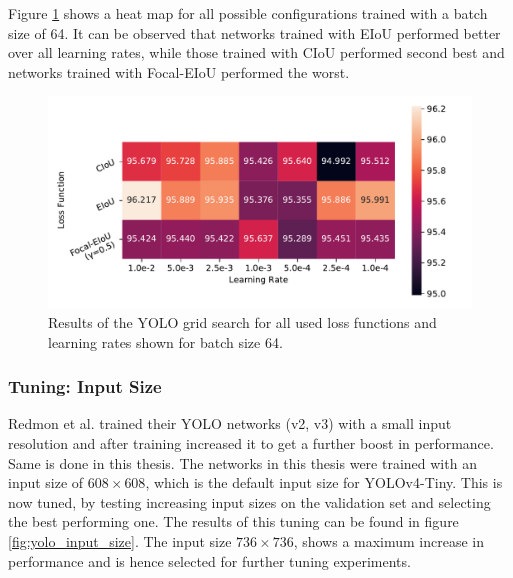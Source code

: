 Figure \ref{fig:yolo_grid_heat_results} shows a heat map for all possible configurations trained with a batch size of 64.
It can be observed that networks trained with \ac{EIoU} performed better over all learning rates, while those trained with \ac{CIoU} performed second best and networks trained with Focal-\ac{EIoU} performed the worst.

\begin{figure}
\begin{center}
    \includegraphics[width=16cm]{imgs/yolo_grid_heat.pdf}
    \caption{Results of the YOLO grid search for all used loss functions and learning rates shown for batch size 64.}
    \label{fig:yolo_grid_heat_results}
\end{center}
\end{figure}

\subsubsection{Tuning: Input Size}

Redmon et al. \cite{yolov2} trained their YOLO networks (v2, v3) with a small input resolution and after training increased it to get a further boost in performance.
Same is done in this thesis.
The networks in this thesis were trained with an input size of $608 \times 608$, which is the default input size for \ac{YOLOv4}-Tiny.
This is now tuned, by testing increasing input sizes on the validation set and selecting the best performing one.
The results of this tuning can be found in figure \ref{fig:yolo_input_size}.
The input size $736 \times 736$, shows a maximum increase in performance and is hence selected for further tuning experiments.

